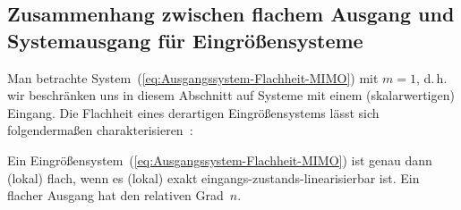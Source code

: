 \subsection{Zusammenhang zwischen flachem Ausgang und Systemausgang für Eingrößensysteme\label{subsec:Flacher-nichtflacher-Ausgang}}

Man betrachte System~(\ref{eq:Ausgangssystem-Flachheit-MIMO}) mit
$m=1$, d.\,h. wir beschränken uns in diesem Abschnitt auf Systeme
mit einem (skalarwertigen) Eingang. Die Flachheit eines derartigen
Eingrößensystems lässt sich folgendermaßen charakterisieren~\cite{nieuwstadt1994}:
\begin{theorem}
\label{thm:flach-EZ-lin-SISO}Ein Eingrößensystem~(\ref{eq:Ausgangssystem-Flachheit-MIMO})
ist genau dann (lokal) flach, wenn es (lokal) exakt eingangs-zustands-linearisierbar
ist. Ein flacher Ausgang hat den relativen Grad~$n$.
\end{theorem}
